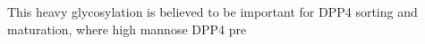 This heavy glycosylation is believed to be important for DPP4 sorting and maturation, where high mannose DPP4 pre\cite{Matter_1991}